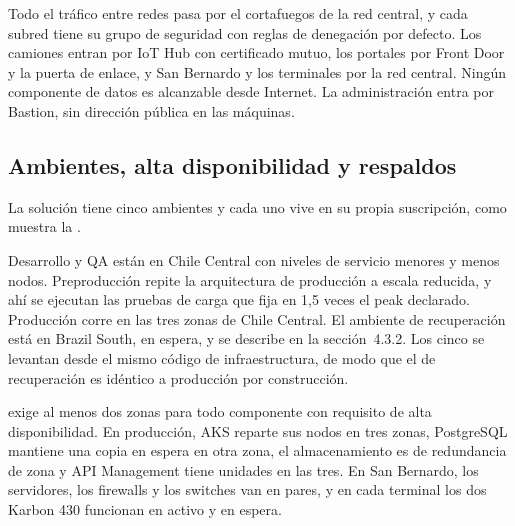 
Todo el tráfico entre redes pasa por el cortafuegos de la red central, y cada subred tiene su grupo de
seguridad con reglas de denegación por defecto. Los camiones entran por IoT Hub con certificado mutuo,
los portales por Front Door y la puerta de enlace, y San Bernardo y los terminales por la red central.
Ningún componente de datos es alcanzable desde Internet. La administración entra por Bastion, sin
dirección pública en las máquinas.


\subsection{Ambientes, alta disponibilidad y respaldos}\label{sec:4-ambientes}

La solución tiene cinco ambientes y cada uno vive en su propia suscripción, como muestra la
.


Desarrollo y QA están en Chile Central con niveles de servicio menores y menos nodos. Preproducción
repite la arquitectura de producción a escala reducida, y ahí se ejecutan las pruebas de carga que
 fija en 1,5 veces el peak declarado. Producción corre en las tres zonas de Chile
Central. El ambiente de recuperación está en Brazil South, en espera, y se describe en la
sección~4.3.2. Los cinco se levantan desde el mismo código de infraestructura, de modo que el de
recuperación es idéntico a producción por construcción.

 exige al menos dos zonas para todo componente con requisito de alta
disponibilidad. En producción, AKS reparte sus nodos en tres zonas, PostgreSQL mantiene una copia en
espera en otra zona, el almacenamiento es de redundancia de zona y API Management tiene unidades en las
tres. En San Bernardo, los servidores, los firewalls y los switches van en pares, y en cada terminal los
dos Karbon 430 funcionan en activo y en espera.

